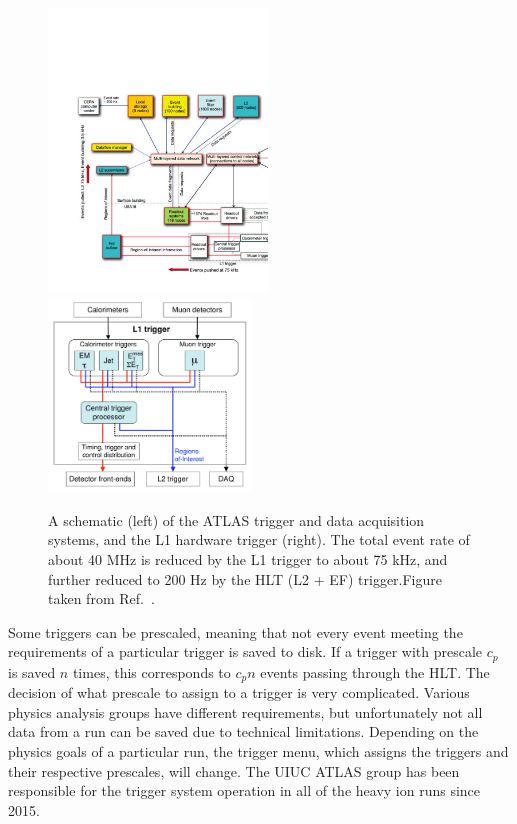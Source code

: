 {\begin{figure}[t]
	\centerline{
		\includegraphics[width=0.52\textwidth]{figures/trig_daq.pdf} %
		\includegraphics[width=0.48\textwidth]{figures/trig_l1.pdf} %
	}
	\caption{ A schematic (left) of the ATLAS trigger and data acquisition systems, and the L1 hardware trigger (right). The total event rate of about 40 MHz is reduced by the L1 trigger to about 75 kHz, and further reduced to 200 Hz by the HLT (L2 + EF) trigger.Figure taken from Ref.~\cite{Aad:2008zzm}.}	
	\label{fig:trigdaq}
\end{figure}

Some triggers can be prescaled, meaning that not every event meeting the requirements of a particular trigger is saved to disk. If a trigger with prescale $c_{p}$ is saved $n$ times, this corresponds to $c_{p}n$ events passing through the HLT. The decision of what prescale to assign to a trigger is very complicated. Various physics analysis groups have different requirements, but unfortunately not all data from a run can be saved due to technical limitations. Depending on the physics goals of a particular run, the trigger menu, which assigns the triggers and their respective prescales, will change. The UIUC ATLAS group has been responsible for the trigger system operation in all of the heavy ion runs since 2015.


}
